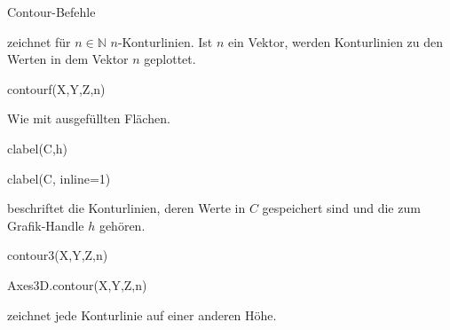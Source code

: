 \documentclass[hyperref={xetex}]{beamer}
\begin{document}
% 
% 
% 
% 
% 
% 
%
% 
% 
\begin{frame}[fragile]{Contour-Befehle}
    \begin{matlabin}
[C,h] = contour(X,Y,Z,n)}
    \end{matlabin} 
zeichnet f\"ur $n\in \mathbb{N}$  $n$-Konturlinien. Ist $n$ ein Vektor, werden Konturlinien zu den Werten in
  dem Vektor $n$ geplottet.
  \begin{matlabin}
contourf(X,Y,Z,n)
  \end{matlabin}
Wie  mit ausgefüllten Flächen.
  \begin{matlabin}
clabel(C,h)   
  \end{matlabin}
  \begin{pyin}
clabel(C, inline=1)   
  \end{pyin}
beschriftet die Konturlinien, deren Werte in $C$
  gespeichert sind und die zum Grafik-Handle $h$ gehören.
  \begin{matlabin}
contour3(X,Y,Z,n)   
  \end{matlabin}
  \begin{pyin}
Axes3D.contour(X,Y,Z,n)   
  \end{pyin}
  zeichnet jede Konturlinie auf einer anderen H\"ohe.
\end{frame}
\end{document}
